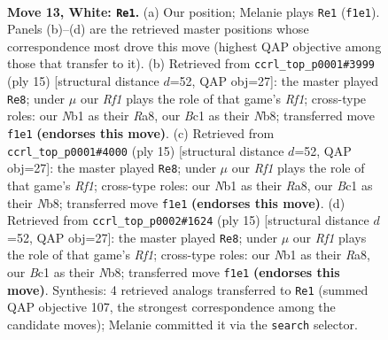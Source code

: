 \documentclass[11pt]{article}
\begin{document}
\clearpage

\begin{figure}[p]\centering
\begin{subfigure}{0.46\textwidth}\centering
\resizebox{\linewidth}{!}{%
\newchessgame
\chessboard[
  setfen={r1bqrk2/pp1nbppp/2n1p3/8/2Pp2P1/1P3N1B/P2P1P1P/RNBQ1RK1 w - - 0 13},
  showmover=false,
  pgfstyle=straightmove, color=movearrow, markmove={f1-e1}
]}
\caption{}
\end{subfigure}\hfill
\begin{subfigure}{0.46\textwidth}\centering
\resizebox{\linewidth}{!}{%
\newchessgame
\chessboard[
  setfen={rnbq1rk1/ppp2pbp/3p1np1/8/2PNP3/2N1B3/PP2BPPP/R2QK2R b KQ - 0 8},
  showmover=false,
  pgfstyle=straightmove, color=movearrow, markmove={f8-e8}
]}
\caption{}
\end{subfigure}
\\[4pt]
\begin{subfigure}{0.46\textwidth}\centering
\resizebox{\linewidth}{!}{%
\newchessgame
\chessboard[
  setfen={rnbq1rk1/ppp2pbp/3p1np1/8/2PNP3/2N1B3/PP2BPPP/R2QK2R b KQ - 0 8},
  showmover=false,
  pgfstyle=straightmove, color=movearrow, markmove={f8-e8}
]}
\caption{}
\end{subfigure}\hfill
\begin{subfigure}{0.46\textwidth}\centering
\resizebox{\linewidth}{!}{%
\newchessgame
\chessboard[
  setfen={rnbq1rk1/ppp2pbp/3p1np1/8/2PNP3/2N1B3/PP2BPPP/R2QK2R b KQ - 0 8},
  showmover=false,
  pgfstyle=straightmove, color=movearrow, markmove={f8-e8}
]}
\caption{}
\end{subfigure}
\caption{\textbf{Move 13, White: \texttt{Re1}.} (a) Our position; Melanie plays \texttt{Re1} (\texttt{f1e1}). Panels (b)--(d) are the retrieved master positions whose correspondence most drove this move (highest QAP objective among those that transfer to it). (b) Retrieved from \texttt{ccrl\_top\_p0001\#3999} (ply 15) [structural distance $d$=52, QAP obj=27]: the master played \texttt{Re8}; under $\mu$ our \emph{Rf1} plays the role of that game's \emph{Rf1}; cross-type roles: our \emph{N}b1 as their \emph{R}a8, our \emph{B}c1 as their \emph{N}b8; transferred move \texttt{f1e1} \textbf{(endorses this move)}. (c) Retrieved from \texttt{ccrl\_top\_p0001\#4000} (ply 15) [structural distance $d$=52, QAP obj=27]: the master played \texttt{Re8}; under $\mu$ our \emph{Rf1} plays the role of that game's \emph{Rf1}; cross-type roles: our \emph{N}b1 as their \emph{R}a8, our \emph{B}c1 as their \emph{N}b8; transferred move \texttt{f1e1} \textbf{(endorses this move)}. (d) Retrieved from \texttt{ccrl\_top\_p0002\#1624} (ply 15) [structural distance $d$=52, QAP obj=27]: the master played \texttt{Re8}; under $\mu$ our \emph{Rf1} plays the role of that game's \emph{Rf1}; cross-type roles: our \emph{N}b1 as their \emph{R}a8, our \emph{B}c1 as their \emph{N}b8; transferred move \texttt{f1e1} \textbf{(endorses this move)}. Synthesis: 4 retrieved analogs transferred to \texttt{Re1} (summed QAP objective 107, the strongest correspondence among the candidate moves); Melanie committed it via the \texttt{search} selector.}
\label{fig:thought-m24}
\end{figure}
\end{document}
